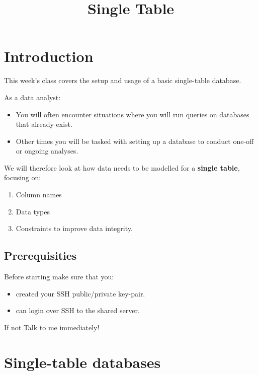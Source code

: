 \documentclass[slides]{pgnotes}
\title{Single Table}
\begin{document}
\maketitle

\tableofcontents

\section{Introduction}
\label{sec:introduction}

This week's class covers the setup and usage of a basic single-table database.

As a data analyst:

\begin{itemize}
\item You will often encounter situations where you will run queries on databases that already exist.
\item Other times you will be tasked with setting up a database to conduct one-off or ongoing analyses.
\end{itemize}
  
We will therefore look at how data needs to be modelled for a \textbf{single table}, focusing on:
\begin{enumerate}
\item Column names
\item Data types
\item Constraints to improve data integrity.
\end{enumerate}




\subsection{Prerequisities}
\label{sec:prerequisities}

Before starting make sure that you:

\begin{itemize}
\item
  created your SSH public/private key-pair.
\item
  can login over SSH to the shared server.
\end{itemize}

\begin{redbox}{If not}
  Talk to me immediately!
\end{redbox}


\section{Single-table databases}
\end{document}
